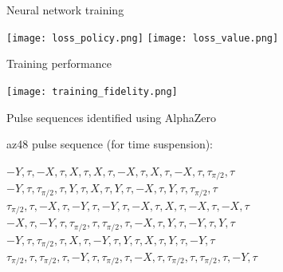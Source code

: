 \documentclass{beamer}
\begin{document}
\begin{frame}{Neural network training}

\texttt{[image: loss\_policy.png]}
\texttt{[image: loss\_value.png]}
\end{frame}

\begin{frame}{Training performance}

\texttt{[image: training\_fidelity.png]}
\end{frame}

\begin{frame}{Pulse sequences identified using AlphaZero}

\textrm{az48} pulse sequence (for time suspension):

$ -Y, \tau, -X, \tau, X, \tau, X, \tau, -X, \tau, X, \tau, -X, \tau, \tau_{\pi/2}, \tau $
$ -Y, \tau, \tau_{\pi/2}, \tau, Y, \tau, X, \tau, Y, \tau, -X, \tau, Y, \tau, \tau_{\pi/2}, \tau $
$ \tau_{\pi/2}, \tau, -X, \tau, -Y, \tau, -Y, \tau, -X, \tau, X, \tau, -X, \tau, -X, \tau $
$ -X, \tau, -Y, \tau, \tau_{\pi/2}, \tau, \tau_{\pi/2}, \tau, -X, \tau, Y, \tau, -Y, \tau, Y, \tau $
$ -Y, \tau, \tau_{\pi/2}, \tau, X, \tau, -Y, \tau, Y, \tau, X, \tau, Y, \tau, -Y, \tau $
$ \tau_{\pi/2}, \tau, \tau_{\pi/2}, \tau, -Y, \tau, \tau_{\pi/2}, \tau, -X, \tau, \tau_{\pi/2}, \tau, \tau_{\pi/2}, \tau, -Y, \tau $

\end{frame}
\end{document}
